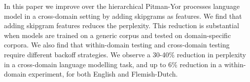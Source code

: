 In this paper we improve over the hierarchical Pitman-Yor processes language model in a cross-domain setting by adding skipgrams as features. We find that adding skipgram features reduces the perplexity. This reduction is substantial when models are trained on a generic corpus and tested on domain-specific corpora. We also find that within-domain testing and cross-domain testing require different backoff strategies. We observe a 30-40\% reduction in perplexity in a cross-domain language modelling task, and up to 6\% reduction in a within-domain experiment, for both English and Flemish-Dutch.
